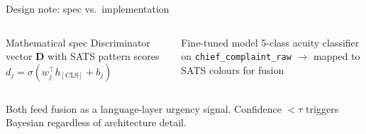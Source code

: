\begin{frame}{Design note: spec vs.\ implementation}
  \begin{columns}[T]
    \begin{block}{Mathematical spec}
      \small
      Discriminator vector $\mathbf{D}$ with SATS pattern scores $d_j = \sigma(w_j^\top h_{[\mathrm{CLS}]} + b_j)$
    \end{block}

    \begin{block}{Fine-tuned model}
      \small
      5-class acuity classifier on \texttt{chief\_complaint\_raw} $\to$ mapped to SATS colours for fusion
    \end{block}
  \end{columns}

  \vspace{0.5em}
  Both feed fusion as a language-layer urgency signal. Confidence $< \tau$ triggers Bayesian regardless of architecture detail.

\end{frame}
